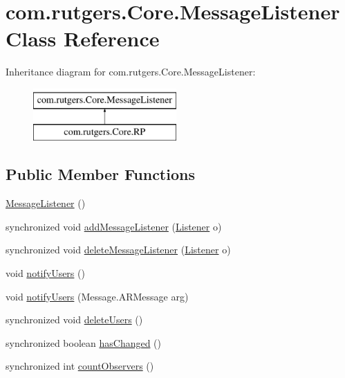 \hypertarget{classcom_1_1rutgers_1_1Core_1_1MessageListener}{}\section{com.\+rutgers.\+Core.\+Message\+Listener Class Reference}
\label{classcom_1_1rutgers_1_1Core_1_1MessageListener}
Inheritance diagram for com.\+rutgers.\+Core.\+Message\+Listener\+:\begin{figure}[H]
\begin{center}
\leavevmode
\includegraphics[height=2.000000cm]{classcom_1_1rutgers_1_1Core_1_1MessageListener}
\end{center}
\end{figure}
\subsection*{Public Member Functions}
\begin{DoxyCompactItemize}
\item 
\hyperlink{classcom_1_1rutgers_1_1Core_1_1MessageListener_a62c2c226668ee66cb62b0f9c0070fe17}{Message\+Listener} ()
\item 
synchronized void \hyperlink{classcom_1_1rutgers_1_1Core_1_1MessageListener_a36123785cf1a468272d74d7a394779eb}{add\+Message\+Listener} (\hyperlink{interfacecom_1_1rutgers_1_1Core_1_1Listener}{Listener} o)
\item 
synchronized void \hyperlink{classcom_1_1rutgers_1_1Core_1_1MessageListener_a58dde408a2879983fe3f1a16b7430a2e}{delete\+Message\+Listener} (\hyperlink{interfacecom_1_1rutgers_1_1Core_1_1Listener}{Listener} o)
\item 
void \hyperlink{classcom_1_1rutgers_1_1Core_1_1MessageListener_a2da962a5db69e62ea529759b9f643851}{notify\+Users} ()
\item 
void \hyperlink{classcom_1_1rutgers_1_1Core_1_1MessageListener_a30277268e1459416379eefa0955db46b}{notify\+Users} (Message.\+A\+R\+Message arg)
\item 
synchronized void \hyperlink{classcom_1_1rutgers_1_1Core_1_1MessageListener_abdf30a5ebb8f88e5a0083c9ea0ac48c2}{delete\+Users} ()
\item 
synchronized boolean \hyperlink{classcom_1_1rutgers_1_1Core_1_1MessageListener_a00241c82f572dc5e692a888f450b78d9}{has\+Changed} ()
\item 
synchronized int \hyperlink{classcom_1_1rutgers_1_1Core_1_1MessageListener_a724d20378cbeac3df288bf36622a8bc5}{count\+Observers} ()
\end{DoxyCompactItemize}
